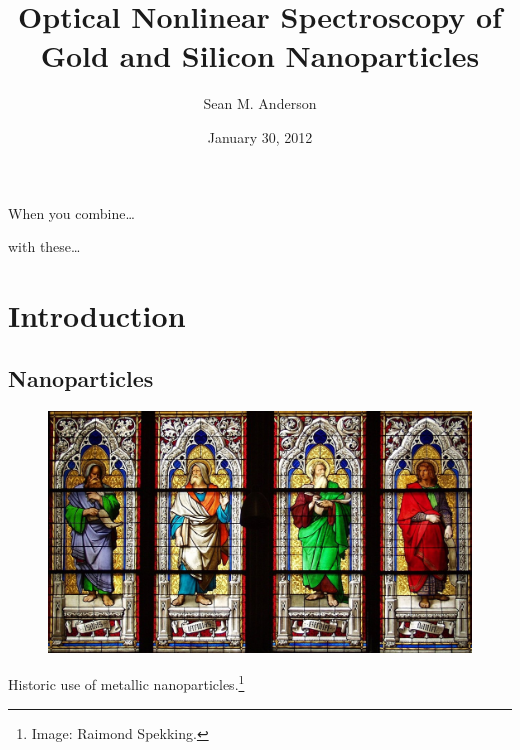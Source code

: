 \documentclass{beamer}
\begin{document}
\title[Optical Nonlinear Spectroscopy of Gold and Silicon Nanoparticles\hspace{5.5cm}\insertframenumber/\inserttotalframenumber]{Optical Nonlinear Spectroscopy of Gold and Silicon Nanoparticles\vspace{-5pt}}
\author{Sean M. Anderson\vspace{-7pt}}
\date{January 30, 2012\vspace{-17pt}}
\titlegraphic{
\begin{figure}
\end{figure}}

\begin{frame}
\titlepage
\end{frame}

\begin{frame}
When you combine\ldots
\begin{center}
\begin{figure}
\end{figure}
\end{center}
with these\ldots
\begin{center}
\begin{figure}
\end{figure}
\end{center}
\end{frame}


\section*{Introduction}
\subsection*{Nanoparticles}
\begin{frame}
\begin{figure}
\centering
\includegraphics[width=\textwidth]{stained}
\end{figure}
\begin{center}
Historic use of metallic nanoparticles.\footnote{Image: Raimond Spekking.}
\end{center}
\end{frame}
\end{document}
